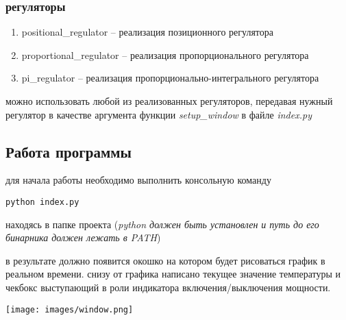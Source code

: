 \documentclass{article}
\begin{document}
\subsubsection{регуляторы}
\begin{enumerate}
    \item positional\_regulator -- реализация позиционного регулятора
    \item proportional\_regulator -- реализация пропорционального регулятора
    \item pi\_regulator -- реализация пропорционально-интегрального регулятора
\end{enumerate}

можно использовать любой из реализованных регуляторов, передавая нужный регулятор в качестве аргумента функции \textit{setup\_window} в файле \textit{index.py}

\subsection{Работа программы}
для начала работы необходимо выполнить консольную команду 

\begin{lstlisting}
python index.py
\end{lstlisting}

находясь в папке проекта (\textit{python должен быть установлен и путь до его бинарника должен лежать в PATH})

в результате должно появится окошко на котором будет рисоваться график в реальном времени. снизу от графика написано текущее значение температуры и чекбокс выступающий в роли индикатора включения/выключения мощности.

\texttt{[image: images/window.png]}
\end{document}
